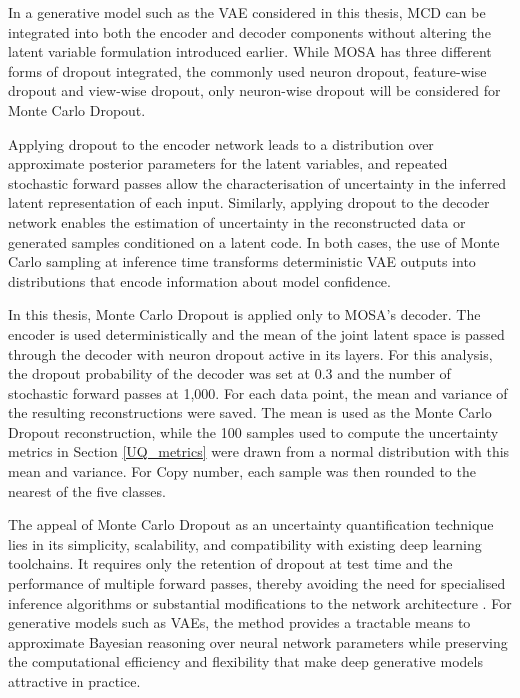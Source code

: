 In a generative model such as the VAE considered in this thesis, MCD can be integrated into both the encoder and decoder components without altering the latent variable formulation introduced earlier. While \gls{MOSA} has three different forms of dropout integrated, the commonly used neuron dropout, feature-wise dropout and view-wise dropout, only neuron-wise dropout will be considered for Monte Carlo Dropout.

Applying dropout to the encoder network leads to a distribution over approximate posterior parameters for the latent variables, and repeated stochastic forward passes allow the characterisation of uncertainty in the inferred latent representation of each input. Similarly, applying dropout to the decoder network enables the estimation of uncertainty in the reconstructed data or generated samples conditioned on a latent code. In both cases, the use of Monte Carlo sampling at inference time transforms deterministic VAE outputs into distributions that encode information about model confidence.

In this thesis, Monte Carlo Dropout is applied only to MOSA's decoder. The encoder is used deterministically and the mean of the joint latent space is passed through the decoder with neuron dropout active in its layers. For this analysis, the dropout probability of the decoder was set at 0.3 and the number of stochastic forward passes at 1,000. For each data point, the mean and variance of the resulting reconstructions were saved. The mean is used as the Monte Carlo Dropout reconstruction, while the 100 samples used to compute the uncertainty metrics in Section \ref{UQ_metrics} were drawn from a normal distribution with this mean and variance. For Copy number, each sample was then rounded to the nearest of the five classes.

The appeal of Monte Carlo Dropout as an uncertainty quantification technique lies in its simplicity, scalability, and compatibility with existing deep learning toolchains. It requires only the retention of dropout at test time and the performance of multiple forward passes, thereby avoiding the need for specialised inference algorithms or substantial modifications to the network architecture \citep{Gal2016Dropout}. For generative models such as VAEs, the method provides a tractable means to approximate Bayesian reasoning over neural network parameters while preserving the computational efficiency and flexibility that make deep generative models attractive in practice.


